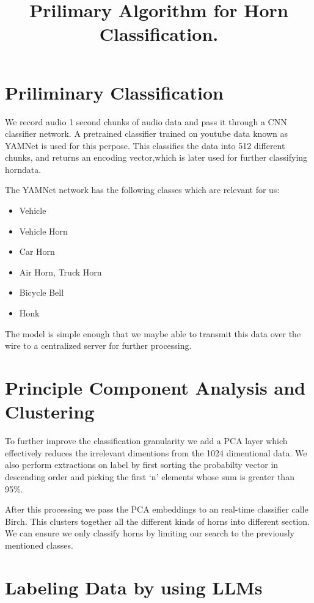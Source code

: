 \documentclass{article}
\title{Prilimary Algorithm for Horn Classification.}
\begin{document}
\maketitle

\section{Priliminary Classification}

We record audio 1 second chunks of audio data and pass it through a CNN classifier network. A pretrained classifier trained on youtube data known as YAMNet is
used for this perpose. This classifies the data into 512 different chunks, and returns an encoding vector,which is later used for further classifying horndata.

The YAMNet network has the following classes which are relevant for us:

\begin{itemize}
    \item Vehicle
    \item Vehicle Horn
    \item Car Horn
    \item Air Horn, Truck Horn
    \item Bicycle Bell
    \item Honk
\end{itemize}

The model is simple enough that we maybe able to transmit this data over the wire to a centralized server for further processing.

\section{Principle Component Analysis and Clustering}

To further improve the classification granularity we add a PCA layer which effectively reduces the irrelevant dimentions from the 1024 dimentional data. We also 
perform extractions on label by first sorting the probabilty vector in descending order and picking the first `n' elements whose sum is greater than 95\%.

After this processing we pass the PCA embeddings to an real-time classifier calle Birch. This clusters together all the different kinds of horns into different section.
We can ensure we only classify horns by limiting our search to the previously mentioned classes.

\section{Labeling Data by using LLMs}
\end{document}
